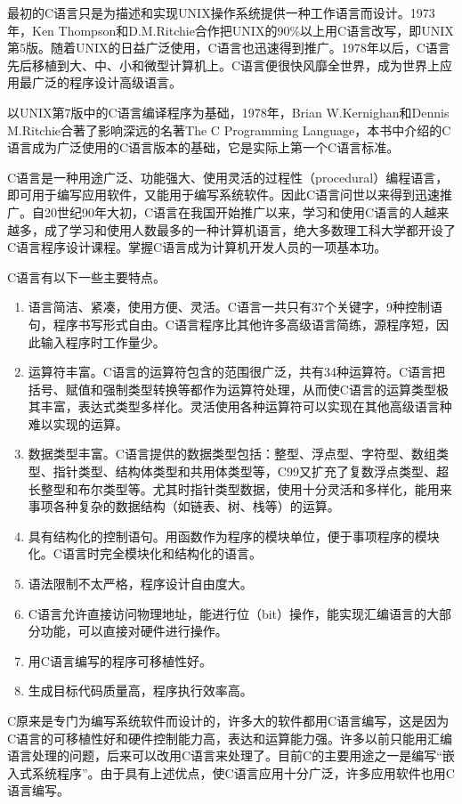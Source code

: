 最初的C语言只是为描述和实现UNIX操作系统提供一种工作语言而设计。1973年，Ken Thompson和D.M.Ritchie合作把UNIX的90\%以上用C语言改写，即UNIX第5版。随着UNIX的日益广泛使用，C语言也迅速得到推广。1978年以后，C语言先后移植到大、中、小和微型计算机上。C语言便很快风靡全世界，成为世界上应用最广泛的程序设计高级语言。

以UNIX第7版中的C语言编译程序为基础，1978年，Brian W.Kernighan和Dennis M.Ritchie合著了影响深远的名著The C Programming Language，本书中介绍的C语言成为广泛使用的C语言版本的基础，它是实际上第一个C语言标准。

C语言是一种用途广泛、功能强大、使用灵活的过程性（procedural）编程语言，即可用于编写应用软件，又能用于编写系统软件。因此C语言问世以来得到迅速推广。自20世纪90年大初，C语言在我国开始推广以来，学习和使用C语言的人越来越多，成了学习和使用人数最多的一种计算机语言，绝大多数理工科大学都开设了C语言程序设计课程。掌握C语言成为计算机开发人员的一项基本功。

C语言有以下一些主要特点。
\begin{enumerate}
	\item 语言简洁、紧凑，使用方便、灵活。C语言一共只有37个关键字，9种控制语句，程序书写形式自由。C语言程序比其他许多高级语言简练，源程序短，因此输入程序时工作量少。
	\item 运算符丰富。C语言的运算符包含的范围很广泛，共有34种运算符。C语言把括号、赋值和强制类型转换等都作为运算符处理，从而使C语言的运算类型极其丰富，表达式类型多样化。灵活使用各种运算符可以实现在其他高级语言种难以实现的运算。
	\item 数据类型丰富。C语言提供的数据类型包括：整型、浮点型、字符型、数组类型、指针类型、结构体类型和共用体类型等，C99又扩充了复数浮点类型、超长整型和布尔类型等。尤其时指针类型数据，使用十分灵活和多样化，能用来事项各种复杂的数据结构（如链表、树、栈等）的运算。
	\item 具有结构化的控制语句。用函数作为程序的模块单位，便于事项程序的模块化。C语言时完全模块化和结构化的语言。
	\item 语法限制不太严格，程序设计自由度大。
	\item C语言允许直接访问物理地址，能进行位（bit）操作，能实现汇编语言的大部分功能，可以直接对硬件进行操作。
	\item 用C语言编写的程序可移植性好。
	\item 生成目标代码质量高，程序执行效率高。
\end{enumerate}

C原来是专门为编写系统软件而设计的，许多大的软件都用C语言编写，这是因为C语言的可移植性好和硬件控制能力高，表达和运算能力强。许多以前只能用汇编语言处理的问题，后来可以改用C语言来处理了。目前C的主要用途之一是编写“嵌入式系统程序”。由于具有上述优点，使C语言应用十分广泛，许多应用软件也用C语言编写。

